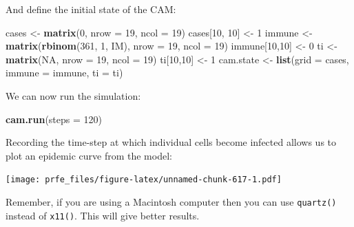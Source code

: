 \documentclass[12pt,a4paper]{book}
\newenvironment{Shaded}{\begin{snugshade}}{\end{snugshade}}
\newcommand{\DataTypeTok}[1]{\textcolor[rgb]{0.13,0.29,0.53}{#1}}
\newcommand{\DecValTok}[1]{\textcolor[rgb]{0.00,0.00,0.81}{#1}}
\newcommand{\KeywordTok}[1]{\textcolor[rgb]{0.13,0.29,0.53}{\textbf{#1}}}
\newcommand{\NormalTok}[1]{#1}
\newcommand{\OperatorTok}[1]{\textcolor[rgb]{0.81,0.36,0.00}{\textbf{#1}}}
\newcommand{\OtherTok}[1]{\textcolor[rgb]{0.56,0.35,0.01}{#1}}
\newcommand{\StringTok}[1]{\textcolor[rgb]{0.31,0.60,0.02}{#1}}
\theoremstyle{definition}
\theoremstyle{definition}
\theoremstyle{definition}
\theoremstyle{remark}
\begin{document}
And define the initial state of the CAM:

\begin{Shaded}
\begin{Highlighting}[]
\NormalTok{cases <-}\StringTok{ }\KeywordTok{matrix}\NormalTok{(}\DecValTok{0}\NormalTok{, }\DataTypeTok{nrow =} \DecValTok{19}\NormalTok{, }\DataTypeTok{ncol =} \DecValTok{19}\NormalTok{)}
\NormalTok{cases[}\DecValTok{10}\NormalTok{, }\DecValTok{10}\NormalTok{] <-}\StringTok{ }\DecValTok{1}
\NormalTok{immune <-}\StringTok{ }\KeywordTok{matrix}\NormalTok{(}\KeywordTok{rbinom}\NormalTok{(}\DecValTok{361}\NormalTok{, }\DecValTok{1}\NormalTok{, IM), }\DataTypeTok{nrow =} \DecValTok{19}\NormalTok{, }\DataTypeTok{ncol =} \DecValTok{19}\NormalTok{)}
\NormalTok{immune[}\DecValTok{10}\NormalTok{,}\DecValTok{10}\NormalTok{] <-}\StringTok{ }\DecValTok{0}
\NormalTok{ti <-}\StringTok{ }\KeywordTok{matrix}\NormalTok{(}\OtherTok{NA}\NormalTok{, }\DataTypeTok{nrow =} \DecValTok{19}\NormalTok{, }\DataTypeTok{ncol =} \DecValTok{19}\NormalTok{)}
\NormalTok{ti[}\DecValTok{10}\NormalTok{,}\DecValTok{10}\NormalTok{] <-}\StringTok{ }\DecValTok{1}
\NormalTok{cam.state <-}\StringTok{ }\KeywordTok{list}\NormalTok{(}\DataTypeTok{grid =}\NormalTok{ cases, }\DataTypeTok{immune =}\NormalTok{ immune, }\DataTypeTok{ti =}\NormalTok{ ti)}
\end{Highlighting}
\end{Shaded}

We can now run the simulation:

\begin{Shaded}
\begin{Highlighting}[]
\KeywordTok{cam.run}\NormalTok{(}\DataTypeTok{steps =} \DecValTok{120}\NormalTok{)}
\end{Highlighting}
\end{Shaded}

Recording the time-step at which individual cells become infected allows
us to plot an epidemic curve from the model:

\begin{Shaded}
\end{Shaded}

\texttt{[image: prfe\_files/figure-latex/unnamed-chunk-617-1.pdf]}

Remember, if you are using a Macintosh computer then you can use
\texttt{quartz()} instead of \texttt{x11()}. This will give better
results.
\end{document}
